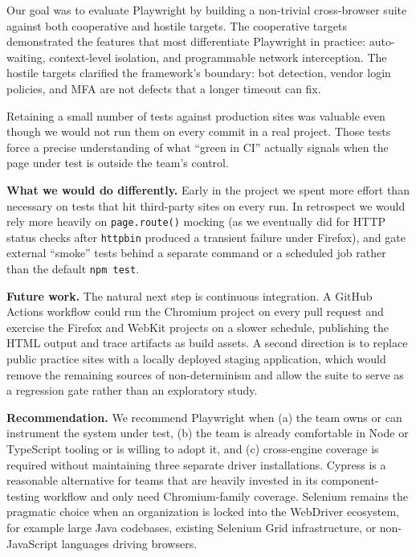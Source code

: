 \documentclass[12pt,letterpaper]{article}
\newcommand{\code}[1]{\texttt{#1}}
\begin{document}
Our goal was to evaluate Playwright by building a non-trivial cross-browser suite against both cooperative and hostile targets. The cooperative targets demonstrated the features that most differentiate Playwright in practice: auto-waiting, context-level isolation, and programmable network interception. The hostile targets clarified the framework's boundary: bot detection, vendor login policies, and MFA are not defects that a longer timeout can fix.

Retaining a small number of tests against production sites was valuable even though we would not run them on every commit in a real project. Those tests force a precise understanding of what ``green in CI'' actually signals when the page under test is outside the team's control.

\textbf{What we would do differently.} Early in the project we spent more effort than necessary on tests that hit third-party sites on every run. In retrospect we would rely more heavily on \code{page.route()} mocking (as we eventually did for HTTP status checks after \code{httpbin} produced a transient failure under Firefox), and gate external ``smoke'' tests behind a separate command or a scheduled job rather than the default \code{npm test}.

\textbf{Future work.} The natural next step is continuous integration. A GitHub Actions workflow could run the Chromium project on every pull request and exercise the Firefox and WebKit projects on a slower schedule, publishing the HTML output and trace artifacts as build assets. A second direction is to replace public practice sites with a locally deployed staging application, which would remove the remaining sources of non-determinism and allow the suite to serve as a regression gate rather than an exploratory study.

\textbf{Recommendation.} We recommend Playwright when (a) the team owns or can instrument the system under test, (b) the team is already comfortable in Node or TypeScript tooling or is willing to adopt it, and (c) cross-engine coverage is required without maintaining three separate driver installations. Cypress is a reasonable alternative for teams that are heavily invested in its component-testing workflow and only need Chromium-family coverage. Selenium remains the pragmatic choice when an organization is locked into the WebDriver ecosystem, for example large Java codebases, existing Selenium Grid infrastructure, or non-JavaScript languages driving browsers.

\end{document}
